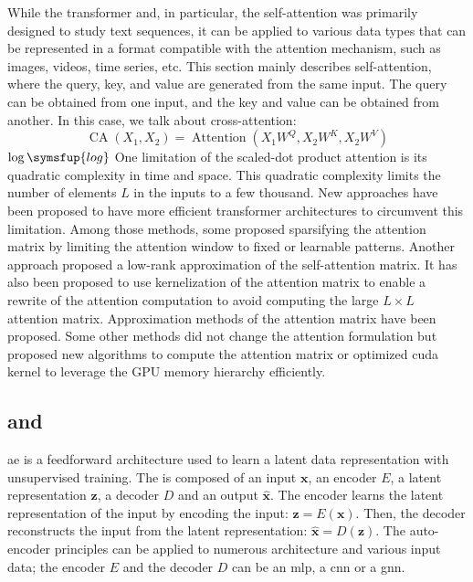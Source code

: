 \documentclass[../main.tex]{subfiles}
\begin{document}
		While the transformer and, in particular, the self-attention was primarily designed to study text sequences, it can be applied to various data types that can be represented in a format compatible with the attention mechanism, such as images, videos, time series, etc.
		This section mainly describes self-attention, where the query, key, and value are generated from the same input.
		The query can be obtained from one input, and the key and value can be obtained from another.
		In this case, we talk about cross-attention:
		\begin{equation}
			\operatorname{CA}\left(X_1, X_2 \right) = \operatorname{Attention} \left(X_1W^Q, X_2W^K, X_2W^V\right) \label{eq:cross_attention}
		\end{equation}
		\(\log \symsfup{log}\)
		One limitation of the scaled-dot product attention is its quadratic complexity in time and space.
		This quadratic complexity limits the number of elements \(L\) in the inputs to a few thousand.
		New approaches have been proposed to have more efficient transformer architectures to circumvent this limitation.
		Among those methods, some proposed sparsifying the attention matrix by limiting the attention window to fixed or learnable patterns.
		Another approach proposed a low-rank approximation of the self-attention matrix.
		It has also been proposed to use kernelization of the attention matrix to enable a rewrite of the attention computation to avoid computing the large \(L \times L\) attention matrix.
		Approximation methods of the attention matrix have been proposed.
		Some other methods did not change the attention formulation but proposed new algorithms to compute the attention matrix or optimized cuda kernel to leverage the GPU memory hierarchy efficiently.

	\subsection{ and }
		\Gls{ae} is a feedforward architecture used to learn a latent data representation with unsupervised training.
		The  is composed of an input \(\symbf{x}\), an encoder \(E\), a latent representation \(\symbf{z}\), a decoder \(D\) and an output \(\symbf{\hat{x}}\).
		The encoder learns the latent representation of the input by encoding the input: \(\symbf{z} = E\left(\symbf{x}\right)\).
		Then, the decoder reconstructs the input from the latent representation: \(\symbf{\hat{x}} = D\left(\symbf{z}\right)\).
		The auto-encoder principles can be applied to numerous architecture and various input data; the encoder \(E\) and the decoder \(D\) can be an \gls{mlp}, a \gls{cnn} or a \gls{gnn}.
\end{document}
